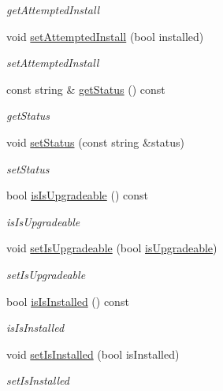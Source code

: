 \begin{DoxyCompactItemize}
\begin{DoxyCompactList}\small\item\em get\+Attempted\+Install \end{DoxyCompactList}\item 
void \hyperlink{classDevice_af2591540bf77d38b8e4c09b90e8dfaba}{set\+Attempted\+Install} (bool installed)
\begin{DoxyCompactList}\small\item\em set\+Attempted\+Install \end{DoxyCompactList}\item 
const string \& \hyperlink{classDevice_ad49afa64f231ac899736cc21027766f2}{get\+Status} () const
\begin{DoxyCompactList}\small\item\em get\+Status \end{DoxyCompactList}\item 
void \hyperlink{classDevice_a46b5e30da5b43b09c0785a054bfb678a}{set\+Status} (const string \&status)
\begin{DoxyCompactList}\small\item\em set\+Status \end{DoxyCompactList}\item 
bool \hyperlink{classDevice_afe6f638cc2bcc512f5bc1f2fef39fe88}{is\+Is\+Upgradeable} () const
\begin{DoxyCompactList}\small\item\em is\+Is\+Upgradeable \end{DoxyCompactList}\item 
void \hyperlink{classDevice_a3b5d4af66cacd8e1b0e45219c16ee084}{set\+Is\+Upgradeable} (bool \hyperlink{classDevice_a1078839b751f8366b5170d4daefa26b4}{is\+Upgradeable})
\begin{DoxyCompactList}\small\item\em set\+Is\+Upgradeable \end{DoxyCompactList}\item 
bool \hyperlink{classDevice_a697feb57b759c13cb1b56f004e61229b}{is\+Is\+Installed} () const
\begin{DoxyCompactList}\small\item\em is\+Is\+Installed \end{DoxyCompactList}\item 
void \hyperlink{classDevice_aec222a879b4a9aadd1a083a7aff2e516}{set\+Is\+Installed} (bool is\+Installed)
\begin{DoxyCompactList}\small\item\em set\+Is\+Installed \end{DoxyCompactList}\item 

\end{DoxyCompactItemize}
